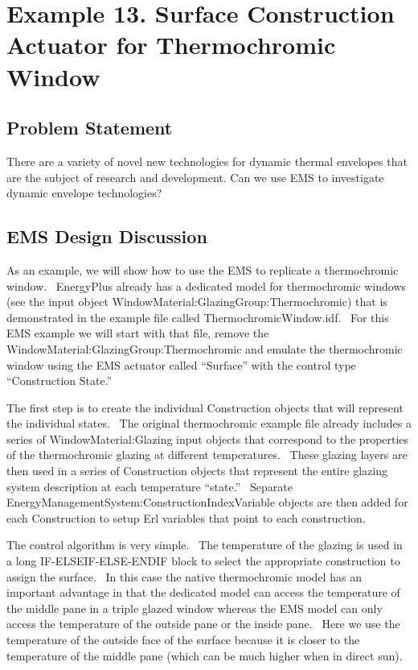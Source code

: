 \section{Example 13. Surface Construction Actuator for Thermochromic Window}\label{example-13.-surface-construction-actuator-for-thermochromic-window}

\subsection{Problem Statement}\label{problem-statement-003}

There are a variety of novel new technologies for dynamic thermal envelopes that are the subject of research and development. Can we use EMS to investigate dynamic envelope technologies?

\subsection{EMS Design Discussion}\label{ems-design-discussion-003}

As an example, we will show how to use the EMS to replicate a thermochromic window.~ EnergyPlus already has a dedicated model for thermochromic windows (see the input object WindowMaterial:GlazingGroup:Thermochromic) that is demonstrated in the example file called ThermochromicWindow.idf.~ For this EMS example we will start with that file, remove the WindowMaterial:GlazingGroup:Thermochromic and emulate the thermochromic window using the EMS actuator called ``Surface'' with the control type ``Construction State.''

The first step is to create the individual Construction objects that will represent the individual states.~ The original thermochromic example file already includes a series of WindowMaterial:Glazing input objects that correspond to the properties of the thermochromic glazing at different temperatures.~ These glazing layers are then used in a series of Construction objects that represent the entire glazing system description at each temperature ``state.''~ Separate EnergyManagementSystem:ConstructionIndexVariable objects are then added for each Construction to setup Erl variables that point to each construction.

The control algorithm is very simple.~ The temperature of the glazing is used in a long IF-ELSEIF-ELSE-ENDIF block to select the appropriate construction to assign the surface.~ In this case the native thermochromic model has an important advantage in that the dedicated model can access the temperature of the middle pane in a triple glazed window whereas the EMS model can only access the temperature of the outside pane or the inside pane.~ Here we use the temperature of the outside face of the surface because it is closer to the temperature of the middle pane (which can be much higher when in direct sun).


